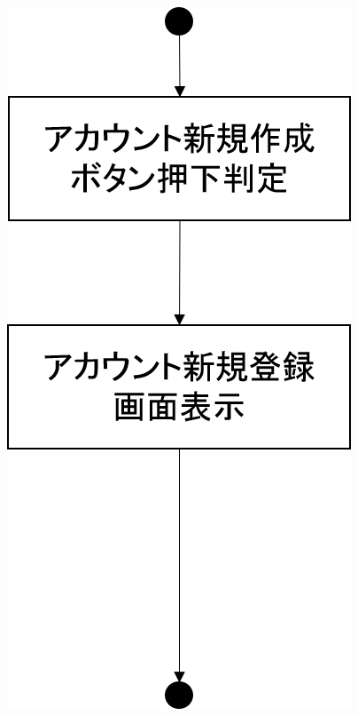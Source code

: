 \begin{figure}[htbp]
 \begin{minipage}{0.5\hsize}
  \begin{center}
   \includegraphics[width=0.5\linewidth,clip]{./img/admin_create_account/sub1.png}
  \end{center}
 \end{minipage}
 \begin{minipage}{0.5\hsize}
  \begin{center}

\end{center}
\end{minipage}
\end{figure}
